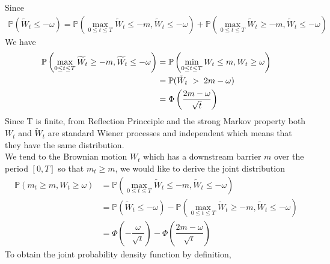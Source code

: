 Since
\begin{align*}
	\mathbb{P}(\widetilde{W}_t\leq -\omega)=\mathbb{P}\left(\displaystyle \max_{0\leq t\leq T}{\widetilde{W}_t}\leq -m, \widetilde{W}_t\leq -\omega\right)+\mathbb{P}\left(\displaystyle \max_{0\leq t\leq T}{\widetilde{W}_t}\geq -m, \widetilde{W}_t\leq -\omega\right)
\end{align*}
We have
\begin{align}
\begin{split}
	\mathbb{P}\left(\displaystyle \max_{0\leq t\leq T}{\widetilde{W}_t}\geq -m, \widetilde{W}_t\leq -\omega\right)&=	\mathbb{P}\left(\displaystyle \min_{0\leq t\leq T}W_t \leq m, W_t\geq \omega\right)\\
	&=\mathbb{P}(\tilde{W}_t\hspace{0.1cm} >\hspace{0.1cm} 2m-\omega)\\
	&=\Phi\left(\dfrac{2m-\omega}{\sqrt{t}}\right)
	\end{split} \label{negative}
\end{align} 
Since T is finite, from Reflection Princciple and the strong Markov property both $W_t$ and $\tilde{W}_t$ are standard Wiener processes and independent which means that they have the same distribution.\\
We tend to the Brownian motion $W_t$ which has a downstream barrier $m$ over the period
$[0, T]$ so that $m_t \geq m$, we would like to derive the joint distribution
\begin{align}
		\mathbb{P}(m_t\geq m, W_t \geq \omega)&=\mathbb{P}\left(\displaystyle \max_{0\leq t\leq T}{\widetilde{W}_t}\leq -m, \widetilde{W}_t\leq -\omega\right) \nonumber\\
		&=\mathbb{P}(\widetilde{W}_t\leq -\omega)-\mathbb{P}\left(\displaystyle \max_{0\leq t\leq T}{\widetilde{W}_t}\geq -m, \widetilde{W}_t\leq -\omega\right) \nonumber \label{eq601}\\
		&=\Phi \left(-\dfrac{\omega}{\sqrt{t}}\right)-\Phi\left(\dfrac{2m-\omega}{\sqrt{t}}\right)
\end{align}
To obtain the joint probability density function by definition,
